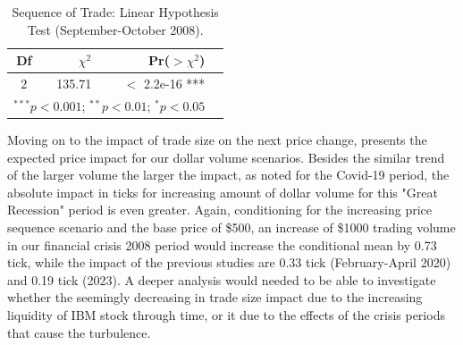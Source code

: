 \begin{table}[H]
    \centering
    \vspace{0.5em}
    \begin{tabular}{crrl}
        \toprule
        Df & $\chi^2$ & Pr($>$$\chi^2$) \\
        \midrule
         2 & 135.71 & $<$ 2.2e-16 *** \\ 
         \bottomrule
        \multicolumn{3}{l}{$^{***}p < 0.001$; $^{**}p < 0.01$; $^{*}p < 0.05$}
    \end{tabular}
        \caption{Sequence of Trade: Linear Hypothesis Test (September-October 2008).}
    \label{tab:table-27}
\end{table}

Moving on to the impact of trade size on the next price change,  presents the expected price impact for our dollar volume scenarios. Besides the similar trend of the larger volume the larger the impact, as noted for the Covid-19 period, the absolute impact in ticks for increasing amount of dollar volume for this "Great Recession" period is even greater. Again, conditioning for the increasing price sequence scenario and the base price of \$500, an increase of \$1000 trading volume in our financial crisis 2008 period would increase the conditional mean by 0.73 tick, while the impact of the previous studies are 0.33 tick (February-April 2020) and 0.19 tick (2023). A deeper analysis would needed to be able to investigate whether the seemingly decreasing in trade size impact due to the increasing liquidity of IBM stock through time, or it due to the effects of the crisis periods that cause the turbulence.







